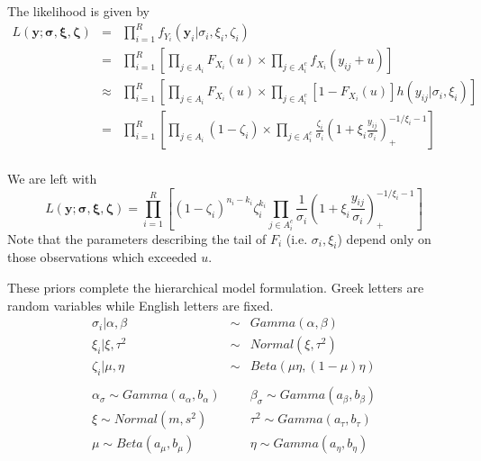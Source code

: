 \documentclass[12pt]{article}
\newcommand{\m}[1]{\mathbf{\bm{#1}}}
\newcommand{\m}[1]{\mathbf{\bm{#1}}}
\begin{document}
\noindent The likelihood is given by
\begin{eqnarray*}
L(\m{y}; \m{\sigma}, \m{\xi}, \m{\zeta}) &=& \prod_{i=1}^R f_{Y_i}(\m{y}_i|\sigma_i,\xi_i,\zeta_i) \\
&=& \prod_{i=1}^R\left[\prod_{j\in A_i} F_{X_i}(u) \times \prod_{j\in A_i^c} f_{X_i}(y_{ij}+u)\right] \\
&\approx& \prod_{i=1}^R\left[\prod_{j\in A_i} F_{X_i}(u) \times \prod_{j\in A_i^c} [1-F_{X_i}(u)]h(y_{ij}|\sigma_i,\xi_i)\right] \\
&=& \prod_{i=1}^R\left[\prod_{j\in A_i} (1-\zeta_i)\times \prod_{j\in A_i^c} \frac{\zeta_i}{\sigma_i}\left(1+\xi_i\frac{y_{ij}}{\sigma_i}\right)_+^{-1/\xi_i-1}\right] \\
\end{eqnarray*}

\noindent We are left with
\[ L(\m{y}; \m{\sigma}, \m{\xi}, \m{\zeta}) = \prod_{i=1}^R\left[(1-\zeta_i)^{n_i-k_i}\zeta_i^{k_i}\prod_{j\in A_i^c}\frac{1}{\sigma_i}\left(1+\xi_i\frac{y_{ij}}{\sigma_i}\right)_+^{-1/\xi_i-1}\right] \]
\noindent Note that the parameters describing the tail of $F_i$ (i.e. $\sigma_i,\xi_i$) depend only on those observations which exceeded $u$.



\noindent These priors complete the hierarchical model formulation. Greek letters are random variables while English letters are fixed.
\begin{eqnarray*}
\sigma_i|\alpha, \beta &\sim& Gamma(\alpha, \beta) \\
\xi_i|\xi, \tau^2  &\sim& Normal(\xi, \tau^2) \\
\zeta_i|\mu, \eta &\sim& Beta(\mu\eta, (1-\mu)\eta) \\
 \\
\alpha_\sigma \sim Gamma(a_\alpha, b_\alpha)&  &\beta_\sigma \sim Gamma(a_\beta, b_\beta) \\
\xi \sim Normal(m, s^2)&  &\tau^2 \sim Gamma(a_\tau, b_\tau) \\
\mu \sim Beta(a_\mu, b_\mu)&  &\eta \sim Gamma(a_\eta, b_\eta) \\
\end{eqnarray*}
\end{document}
